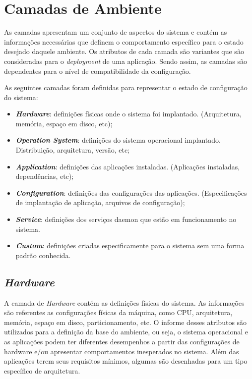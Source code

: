 \section{Camadas de Ambiente}
\label{sec:cam-amb}

As camadas apresentam um conjunto de aspectos do sistema e contém as
informações necessárias que definem o comportamento específico para o
estado desejado daquele ambiente. Os atributos de cada camada são variantes
que são consideradas para o \textit{deployment} de uma aplicação. Sendo assim, as
camadas são dependentes para o nível de compatibilidade da configuração.

As seguintes camadas foram definidas para representar o estado de configuração do
sistema:
\begin{itemize}
  \item \textit{\textbf{Hardware}}: definições físicas onde o sistema foi implantado.
    (Arquitetura, memória, espaço em disco, etc);
  \item \textit{\textbf{Operation System}}: definições do sistema operacional
    implantado. Distribuição, arquitetura, versão, etc;
  \item \textit{\textbf{Application}}: definições das aplicações instaladas.
    (Aplicações instaladas, dependências, etc);
  \item \textit{\textbf{Configuration}}: definições das configurações das
    aplicações. (Especificações de implantação de aplicação, arquivos
    de configuração);
  \item \textit{\textbf{Service}}: definições dos serviços daemon que estão em
    funcionamento no sistema.
  \item \textit{\textbf{Custom}}: definições criadas especificamente para o
    sistema sem uma forma padrão conhecida.
\end{itemize}

\subsection{\textit{Hardware}}
\label{sec:cam-hard}

A camada de \textit{Hardware} contém as definições físicas do sistema.
As informações são referentes as configurações físicas da máquina, como
CPU, arquitetura, memória, espaço em disco, particionamento, etc. O informe desses atributos
são utilizados para a definição da base do ambiente, ou seja, o sistema
operacional e as aplicações podem ter diferentes desempenhos a partir das
configurações de hardware e/ou apresentar comportamentos inesperados no sistema.
Além das aplicações terem seus requisitos mínimos, algumas são desenhadas
para um tipo específico de arquitetura.

